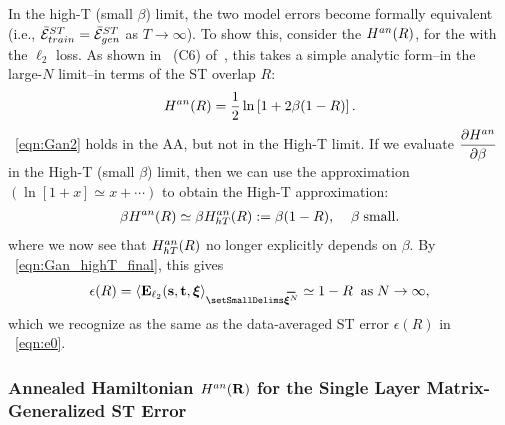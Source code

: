 In the high-T (small $\beta$) limit, the two model errors become formally equivalent
(i.e., $\bar{\mathcal{E}}^{ST}_{train}=\bar{\mathcal{E}}^{ST}_{gen}$ as $T\rightarrow\infty$).
To show this, consider the \AnnealedHamiltonian $H^{an}(R)$, for the \LinearPerceptron with the $\ell_2$ loss. 
As shown in \EQN~(C6) of~\cite{SST92}, this takes a simple analytic form--in the large-$N$ limit--in terms of the ST overlap $R$:
\begin{align}
\label{eqn:Gan2}
H^{an}(R) = \dfrac{1}{2}\ln\left[{1+2\beta(1-R)}\right]  .
\end{align}
\EQN~\ref{eqn:Gan2} holds in the AA, but not in the High-T limit.
If we evaluate $\dfrac{\partial H^{an}}{\partial \beta}$ in the High-T (small $\beta$) limit, 
then we can use the approximation $(\ln[1+x]\simeq x+\cdots)$ to obtain the High-T approximation:
\begin{align}
\label{eqn:Gan3}
\beta H^{an}(R) \simeq 
\beta H^{an}_{hT}(R):=\beta(1-R),\;\;\;\;\beta\;\text{small}  .
\end{align}
where we now see that $H^{an}_{hT}(R)$ no longer explicitly depends on $\beta$.
%
By \EQN~\ref{eqn:Gan_highT_final}, this gives 
\begin{align}
\label{eqn:Gan4}
\EPSL(R) =
\langle  \mathbf{E}_{\ell_2}(\SVEC,\TVEC,\XI \rangle_{\AVGNDXI} \simeq 1-R\;\;\text{as}\;N\rightarrow\infty  ,
\end{align}
which we recognize as the same as the data-averaged ST error $\epsilon(R)$ in \EQN~\ref{eqn:e0}.


\subsubsection{Annealed Hamiltonian $H^{an}(\mathbf{R})$ for the Single Layer Matrix-Generalized ST Error}
\label{sxn:appendix_Gan}

